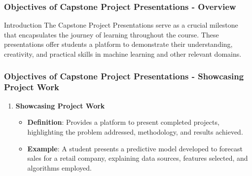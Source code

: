 \documentclass[aspectratio=169]{beamer}
\begin{document}
\begin{frame}[fragile]
    \frametitle{Objectives of Capstone Project Presentations - Overview}
    \begin{block}{Introduction}
        The Capstone Project Presentations serve as a crucial milestone that encapsulates the journey of learning throughout the course. 
        These presentations offer students a platform to demonstrate their understanding, creativity, and practical skills in machine learning and other relevant domains.
    \end{block}
\end{frame}

\begin{frame}[fragile]
    \frametitle{Objectives of Capstone Project Presentations - Showcasing Project Work}
    \begin{enumerate}
        \item \textbf{Showcasing Project Work}
            \begin{itemize}
                \item \textbf{Definition}: Provides a platform to present completed projects, highlighting the problem addressed, methodology, and results achieved.
                \item \textbf{Example}: 
                A student presents a predictive model developed to forecast sales for a retail company, explaining data sources, features selected, and algorithms employed.
            \end{itemize}
    \end{enumerate}
\end{frame}
\end{document}
